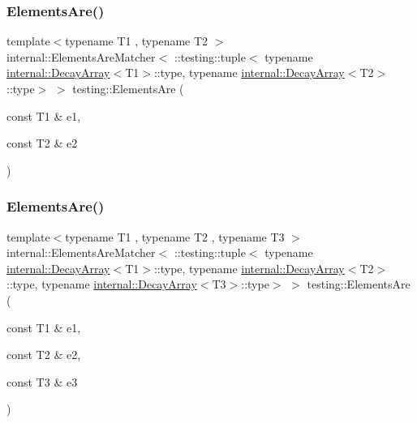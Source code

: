 \subsubsection{\texorpdfstring{ElementsAre()}{ElementsAre()}\hspace{0.1cm}{\footnotesize\ttfamily [3/11]}}
{\footnotesize\ttfamily template$<$typename T1 , typename T2 $>$ \\
internal\+::\+Elements\+Are\+Matcher$<$ \+::testing\+::tuple$<$ typename \mbox{\hyperlink{structtesting_1_1internal_1_1_decay_array}{internal\+::\+Decay\+Array}}$<$T1$>$\+::type, typename \mbox{\hyperlink{structtesting_1_1internal_1_1_decay_array}{internal\+::\+Decay\+Array}}$<$T2$>$\+::type$>$ $>$ testing\+::\+Elements\+Are (\begin{DoxyParamCaption}\item[{const T1 \&}]{e1,  }\item[{const T2 \&}]{e2 }\end{DoxyParamCaption})\hspace{0.3cm}{\ttfamily [inline]}}

\mbox{\label{namespacetesting_a0be8a0ad5d7461fd1da13ecac4e21e2a}} 
\subsubsection{\texorpdfstring{ElementsAre()}{ElementsAre()}\hspace{0.1cm}{\footnotesize\ttfamily [4/11]}}
{\footnotesize\ttfamily template$<$typename T1 , typename T2 , typename T3 $>$ \\
internal\+::\+Elements\+Are\+Matcher$<$ \+::testing\+::tuple$<$ typename \mbox{\hyperlink{structtesting_1_1internal_1_1_decay_array}{internal\+::\+Decay\+Array}}$<$T1$>$\+::type, typename \mbox{\hyperlink{structtesting_1_1internal_1_1_decay_array}{internal\+::\+Decay\+Array}}$<$T2$>$\+::type, typename \mbox{\hyperlink{structtesting_1_1internal_1_1_decay_array}{internal\+::\+Decay\+Array}}$<$T3$>$\+::type$>$ $>$ testing\+::\+Elements\+Are (\begin{DoxyParamCaption}\item[{const T1 \&}]{e1,  }\item[{const T2 \&}]{e2,  }\item[{const T3 \&}]{e3 }\end{DoxyParamCaption})\hspace{0.3cm}{\ttfamily [inline]}}

